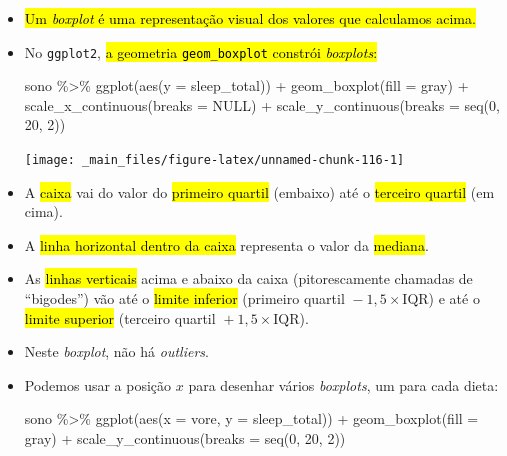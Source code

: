 \documentclass[
  11pt]{report}
\newenvironment{Shaded}{\begin{snugshade}}{\end{snugshade}}
\newcommand{\AttributeTok}[1]{\textcolor[rgb]{0.77,0.63,0.00}{#1}}
\newcommand{\ConstantTok}[1]{\textcolor[rgb]{0.00,0.00,0.00}{#1}}
\newcommand{\DecValTok}[1]{\textcolor[rgb]{0.00,0.00,0.81}{#1}}
\newcommand{\FunctionTok}[1]{\textcolor[rgb]{0.00,0.00,0.00}{#1}}
\newcommand{\NormalTok}[1]{#1}
\newcommand{\SpecialCharTok}[1]{\textcolor[rgb]{0.00,0.00,0.00}{#1}}
\newcommand{\StringTok}[1]{\textcolor[rgb]{0.31,0.60,0.02}{#1}}
\renewenvironment{Shaded}{
    \begin{mdframed}[%
      roundcorner=2pt,%
      innerleftmargin=5pt,%
      innerrightmargin=5pt,%
      topline=true,%
      leftline=true,%
      rightline=true,%
      bottomline=true,%
      linewidth=0.5pt,%
      linecolor=black!20,%
      backgroundcolor=black!2,%
      skipabove=2ex,%
      skipbelow=2.5ex%
    ]%
  }
  {
    \end{mdframed}
  }
\begin{document}
\begin{itemize}
\item
  {\hl{Um \emph{boxplot} é uma representação visual dos valores que calculamos acima.}}
\item
  No \texttt{ggplot2}, {\hl{a geometria {\mbox{\texttt{geom\_boxplot}}} constrói \emph{boxplots}:}}

\begin{Shaded}
\begin{Highlighting}[]
\NormalTok{sono }\SpecialCharTok{\%\textgreater{}\%} 
  \FunctionTok{ggplot}\NormalTok{(}\FunctionTok{aes}\NormalTok{(}\AttributeTok{y =}\NormalTok{ sleep\_total)) }\SpecialCharTok{+}
    \FunctionTok{geom\_boxplot}\NormalTok{(}\AttributeTok{fill =} \StringTok{\textquotesingle{}gray\textquotesingle{}}\NormalTok{) }\SpecialCharTok{+}
    \FunctionTok{scale\_x\_continuous}\NormalTok{(}\AttributeTok{breaks =} \ConstantTok{NULL}\NormalTok{) }\SpecialCharTok{+}
    \FunctionTok{scale\_y\_continuous}\NormalTok{(}\AttributeTok{breaks =} \FunctionTok{seq}\NormalTok{(}\DecValTok{0}\NormalTok{, }\DecValTok{20}\NormalTok{, }\DecValTok{2}\NormalTok{))}
\end{Highlighting}
\end{Shaded}

  \begin{center}\texttt{[image: \_main\_files/figure-latex/unnamed-chunk-116-1]} \end{center}
\item
  A {\hl{caixa}} vai do valor do {\hl{primeiro quartil}} (embaixo) até o {\hl{terceiro quartil}} (em cima).
\item
  A {\hl{linha horizontal dentro da caixa}} representa o valor da {\hl{mediana}}.
\item
  As {\hl{linhas verticais}} acima e abaixo da caixa (pitorescamente chamadas de ``bigodes'') vão até o {\hl{limite inferior}} (primeiro quartil ${}- 1{,}5 \times \text{IQR}$) e até o {\hl{limite superior}} (terceiro quartil ${}+ 1{,}5 \times \text{IQR}$).
\item
  Neste \emph{boxplot}, não há \emph{outliers}.
\item
  \protect\hypertarget{onivoros}{}{} Podemos usar a posição $x$ para desenhar vários \emph{boxplots}, um para cada dieta:

\begin{Shaded}
\begin{Highlighting}[]
\NormalTok{sono }\SpecialCharTok{\%\textgreater{}\%} 
  \FunctionTok{ggplot}\NormalTok{(}\FunctionTok{aes}\NormalTok{(}\AttributeTok{x =}\NormalTok{ vore, }\AttributeTok{y =}\NormalTok{ sleep\_total)) }\SpecialCharTok{+}
    \FunctionTok{geom\_boxplot}\NormalTok{(}\AttributeTok{fill =} \StringTok{\textquotesingle{}gray\textquotesingle{}}\NormalTok{) }\SpecialCharTok{+}
    \FunctionTok{scale\_y\_continuous}\NormalTok{(}\AttributeTok{breaks =} \FunctionTok{seq}\NormalTok{(}\DecValTok{0}\NormalTok{, }\DecValTok{20}\NormalTok{, }\DecValTok{2}\NormalTok{))}
\end{Highlighting}
\end{Shaded}


\end{itemize}
\end{document}
